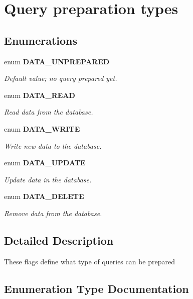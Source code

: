 \section{Query preparation types}
\label{group__DATA__PrepareType}
\subsection*{Enumerations}
\begin{DoxyCompactItemize}
\item 
enum {\bf DATA\_\-UNPREPARED} 
\begin{DoxyCompactList}\small\item\em Default value; no query prepared yet. \end{DoxyCompactList}\item 
enum {\bf DATA\_\-READ} 
\begin{DoxyCompactList}\small\item\em Read data from the database. \end{DoxyCompactList}\item 
enum {\bf DATA\_\-WRITE} 
\begin{DoxyCompactList}\small\item\em Write new data to the database. \end{DoxyCompactList}\item 
enum {\bf DATA\_\-UPDATE} 
\begin{DoxyCompactList}\small\item\em Update data in the database. \end{DoxyCompactList}\item 
enum {\bf DATA\_\-DELETE} 
\begin{DoxyCompactList}\small\item\em Remove data from the database. \end{DoxyCompactList}\end{DoxyCompactItemize}


\subsection{Detailed Description}
These flags define what type of queries can be prepared 

\subsection{Enumeration Type Documentation}
